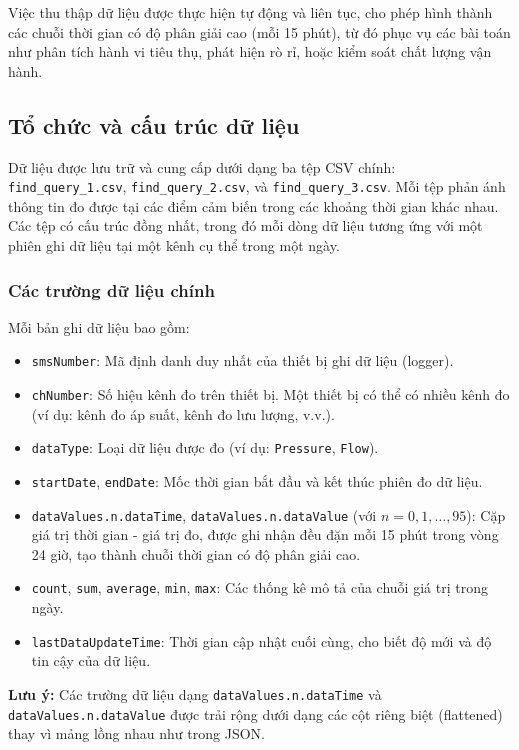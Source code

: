 Việc thu thập dữ liệu được thực hiện tự động và liên tục, cho phép hình thành các chuỗi thời gian có độ phân giải cao (mỗi 15 phút), từ đó phục vụ các bài toán như phân tích hành vi tiêu thụ, phát hiện rò rỉ, hoặc kiểm soát chất lượng vận hành.

\subsection{Tổ chức và cấu trúc dữ liệu}

Dữ liệu được lưu trữ và cung cấp dưới dạng ba tệp CSV chính: \texttt{find\_query\_1.csv}, \texttt{find\_query\_2.csv}, và \texttt{find\_query\_3.csv}. Mỗi tệp phản ánh thông tin đo được tại các điểm cảm biến trong các khoảng thời gian khác nhau. Các tệp có cấu trúc đồng nhất, trong đó mỗi dòng dữ liệu tương ứng với một phiên ghi dữ liệu tại một kênh cụ thể trong một ngày.

\subsubsection{Các trường dữ liệu chính}

Mỗi bản ghi dữ liệu bao gồm:

\begin{itemize}
    \item \texttt{smsNumber}: Mã định danh duy nhất của thiết bị ghi dữ liệu (logger).
    \item \texttt{chNumber}: Số hiệu kênh đo trên thiết bị. Một thiết bị có thể có nhiều kênh đo (ví dụ: kênh đo áp suất, kênh đo lưu lượng, v.v.).
    \item \texttt{dataType}: Loại dữ liệu được đo (ví dụ: \texttt{Pressure}, \texttt{Flow}).
    \item \texttt{startDate}, \texttt{endDate}: Mốc thời gian bắt đầu và kết thúc phiên đo dữ liệu.
    \item \texttt{dataValues.n.dataTime}, \texttt{dataValues.n.dataValue} (với $n = 0,1,\ldots,95$): Cặp giá trị thời gian - giá trị đo, được ghi nhận đều đặn mỗi 15 phút trong vòng 24 giờ, tạo thành chuỗi thời gian có độ phân giải cao.
    \item \texttt{count}, \texttt{sum}, \texttt{average}, \texttt{min}, \texttt{max}: Các thống kê mô tả của chuỗi giá trị trong ngày.
    \item \texttt{lastDataUpdateTime}: Thời gian cập nhật cuối cùng, cho biết độ mới và độ tin cậy của dữ liệu.
\end{itemize}

\noindent
\textbf{Lưu ý:} Các trường dữ liệu dạng \texttt{dataValues.n.dataTime} và \texttt{dataValues.n.dataValue} được trải rộng dưới dạng các cột riêng biệt (flattened) thay vì mảng lồng nhau như trong JSON.

